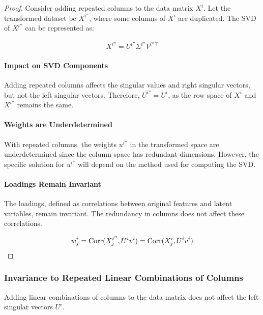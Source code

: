 \begin{proof}
Consider adding repeated columns to the data matrix \( X^{i} \). Let the transformed dataset be \( X^{i''} \), where some columns of \( X^{i} \) are duplicated. The SVD of \( X^{i''} \) can be represented as:

\begin{align}
    X^{i''} = U^{i''}\Sigma^{i''}V^{i''\top} \label{eq:svd_repeated}
\end{align}

\paragraph{Impact on SVD Components}
Adding repeated columns affects the singular values and right singular vectors, but not the left singular vectors. Therefore, \( U^{i''} = U^{i} \), as the row space of \( X^{i} \) and \( X^{i''} \) remains the same.

\paragraph{Weights are Underdetermined}
With repeated columns, the weights \( u^{i''} \) in the transformed space are underdetermined since the column space has redundant dimensions. However, the specific solution for \( u^{i''} \) will depend on the method used for computing the SVD.

\paragraph{Loadings Remain Invariant}
The loadings, defined as correlations between original features and latent variables, remain invariant. The redundancy in columns does not affect these correlations.

\begin{align}
    w^{i}_j = \operatorname{Corr}(X^{i''}_j, U^{i}v^{i}) = \operatorname{Corr}(X^{i}_j, U^{i}v^{i}) \label{eq:loading_invariant_repeated}
\end{align}
\end{proof}

\subsubsection{Invariance to Repeated Linear Combinations of Columns}\label{subsubsec:invariance-to-linear-combinations}

\begin{lemma}
Adding linear combinations of columns to the data matrix does not affect the left singular vectors $U^{i}$.
\end{lemma}

